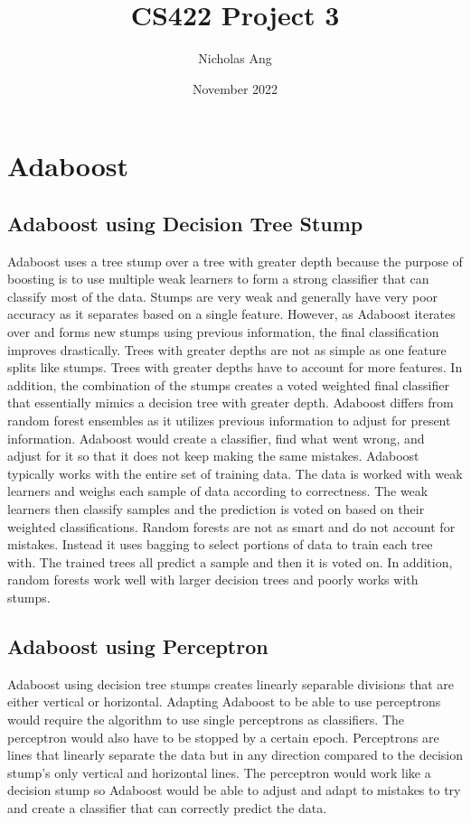 \documentclass{article}
\title{CS422 Project 3}
\author{Nicholas Ang}
\date{November 2022}
\begin{document}
\maketitle
\clearpage
\section*{Adaboost}

\subsection*{Adaboost using Decision Tree Stump}
Adaboost uses a tree stump over a tree with greater depth because the purpose of boosting is to use multiple weak learners to form a strong classifier that can classify most of the data. Stumps are very weak and generally have very poor accuracy as it separates based on a single feature. However, as Adaboost iterates over and forms new stumps using previous information, the final classification improves drastically. Trees with greater depths are not as simple as one feature splits like stumps. Trees with greater depths have to account for more features. In addition, the combination of the stumps creates a voted weighted final classifier that essentially mimics a decision tree with greater depth.
\newline
\newline
Adaboost differs from random forest ensembles as it utilizes previous information to adjust for present information. Adaboost would create a classifier, find what went wrong, and adjust for it so that it does not keep making the same mistakes. Adaboost typically works with the entire set of training data. The data is worked with weak learners and weighs each sample of data according to correctness. The weak learners then classify samples and the prediction is voted on based on their weighted classifications. Random forests are not as smart and do not account for mistakes. Instead it uses bagging to select portions of data to train each tree with. The trained trees all predict a sample and then it is voted on. In addition, random forests work well with larger decision trees and poorly works with stumps.

\subsection*{Adaboost using Perceptron}
Adaboost using decision tree stumps creates linearly separable divisions that are either vertical or horizontal. Adapting Adaboost to be able to use perceptrons would require the algorithm to use single perceptrons as classifiers. The perceptron would also have to be stopped by a certain epoch. Perceptrons are lines that linearly separate the data but in any direction compared to the decision stump's only vertical and horizontal lines. The perceptron would work like a decision stump so Adaboost would be able to adjust and adapt to mistakes to try and create a classifier that can correctly predict the data.
\end{document}

